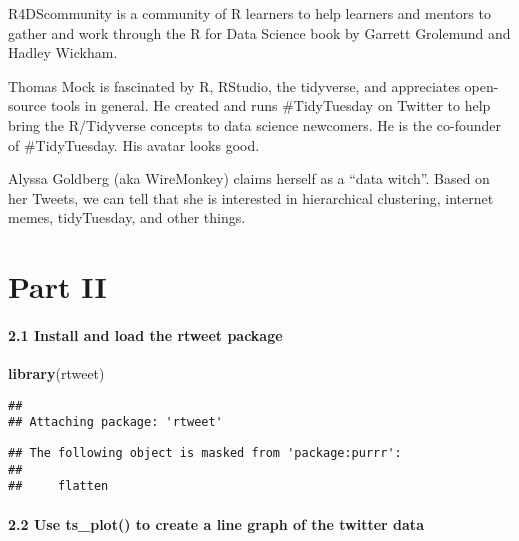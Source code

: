 \documentclass[]{article}
\newenvironment{Shaded}{\begin{snugshade}}{\end{snugshade}}
\newcommand{\KeywordTok}[1]{\textcolor[rgb]{0.13,0.29,0.53}{\textbf{#1}}}
\newcommand{\NormalTok}[1]{#1}
\let\oldparagraph\paragraph
\renewcommand{\paragraph}[1]{\oldparagraph{#1}\mbox{}}
\begin{document}
R4DScommunity is a community of R learners to help learners and mentors
to gather and work through the R for Data Science book by Garrett
Grolemund and Hadley Wickham.

Thomas Mock is fascinated by R, RStudio, the tidyverse, and appreciates
open-source tools in general. He created and runs \#TidyTuesday on
Twitter to help bring the R/Tidyverse concepts to data science
newcomers. He is the co-founder of \#TidyTuesday. His avatar looks good.

Alyssa Goldberg (aka WireMonkey) claims herself as a ``data witch''.
Based on her Tweets, we can tell that she is interested in hierarchical
clustering, internet memes, tidyTuesday, and other things.

\hypertarget{part-ii}{%
\section{Part II}\label{part-ii}}

\hypertarget{install-and-load-the-rtweet-package}{%
\paragraph{2.1 Install and load the rtweet
package}\label{install-and-load-the-rtweet-package}}

\begin{Shaded}
\begin{Highlighting}[]
\KeywordTok{library}\NormalTok{(rtweet)}
\end{Highlighting}
\end{Shaded}

\begin{verbatim}
## 
## Attaching package: 'rtweet'
\end{verbatim}

\begin{verbatim}
## The following object is masked from 'package:purrr':
## 
##     flatten
\end{verbatim}

\hypertarget{use-ts_plot-to-create-a-line-graph-of-the-twitter-data}{%
\paragraph{2.2 Use ts\_plot() to create a line graph of the twitter
data}\label{use-ts_plot-to-create-a-line-graph-of-the-twitter-data}}
\end{document}

